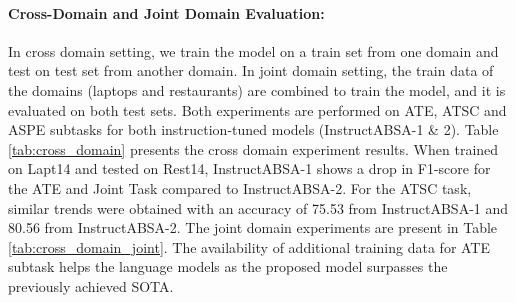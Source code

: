 \documentclass[11pt]{article}
\newcommand{\name}{\textsc{I}nstruct\textsc{ABSA}\xspace}
\begin{document}
\paragraph{Cross-Domain and Joint Domain Evaluation:} 
 
In cross domain setting, we train the model on a train set from one domain and test on test set from another domain. 
In joint domain setting, the train data of the domains (laptops and restaurants) are combined to train the model, and it is evaluated on both test sets. 
Both experiments are performed on ATE, ATSC and ASPE subtasks for both instruction-tuned models (\name{}-1 \& 2).
Table \ref{tab:cross_domain} presents the cross domain experiment results. 
When trained on Lapt14 and tested on Rest14, \name{}-1 shows a drop in F1-score for the ATE and Joint Task compared to \name{}-2.
For the ATSC task, similar trends were obtained with an accuracy of 75.53 from \name{}-1 and 80.56 from \name{}-2.
The joint domain experiments are present in Table \ref{tab:cross_domain_joint}.
The availability of additional training data for ATE subtask helps the language models as the proposed model surpasses the previously achieved SOTA.
\end{document}
